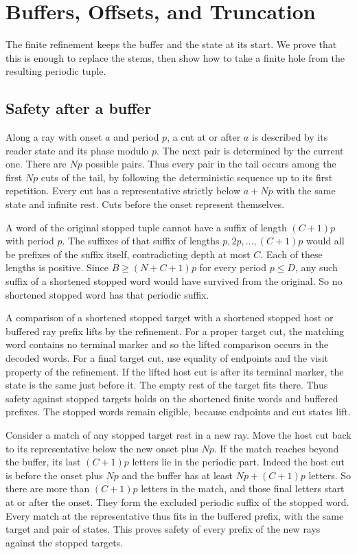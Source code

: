\section{Buffers, Offsets, and Truncation}
\label{app:truncation}

The finite refinement keeps the buffer and the state at its start.
We prove that this is enough to replace the stems, then show how
to take a finite hole from the resulting periodic tuple.

\subsection{Safety after a buffer}

Along a ray with onset $a$ and period $p$, a cut at or after
$a$ is described by its reader state and its phase modulo $p$.
The next pair is determined by the current one. There are $Np$
possible pairs. Thus every pair in the tail occurs among the first
$Np$ cuts of the tail, by following the deterministic sequence
up to its first repetition. Every cut has a representative
strictly below $a+Np$ with the same state and infinite rest.
Cuts before the onset represent themselves.

A word of the original stopped tuple cannot have a suffix of
length $(C+1)p$ with period $p$. The suffixes of that suffix of
lengths $p,2p,\dots,(C+1)p$ would all be prefixes of the suffix
itself, contradicting depth at most $C$. Each of these lengths is
positive. Since $B\ge (N+C+1)p$ for every period $p\le D$, any
such suffix of a shortened stopped word would have survived from
the original. So no shortened stopped word has that periodic suffix.

A comparison of a shortened stopped target with a shortened stopped
host or buffered ray prefix lifts by the refinement. For a proper
target cut, the matching word contains no terminal marker and so
the lifted comparison occurs in the decoded words. For a final
target cut, use equality of endpoints and the visit property of
the refinement. If the lifted host cut is after its terminal
marker, the state is the same just before it. The empty rest of
the target fits there. Thus safety against stopped targets holds
on the shortened finite words and buffered prefixes. The stopped
words remain eligible, because endpoints and cut states lift.

Consider a match of any stopped target rest in a new ray. Move
the host cut back to its representative below the new onset
plus $Np$. If the match reaches beyond the buffer, its last
$(C+1)p$ letters lie in the periodic part. Indeed the host cut
is before the onset plus $Np$ and the buffer has at least
$Np+(C+1)p$ letters. So there are more than $(C+1)p$ letters in
the match, and those final letters start at or after the onset.
They form the excluded periodic suffix of the stopped word.
Every match at the representative thus fits in the buffered
prefix, with the same target and pair of states. This proves safety
of every prefix of the new rays against the stopped targets.

